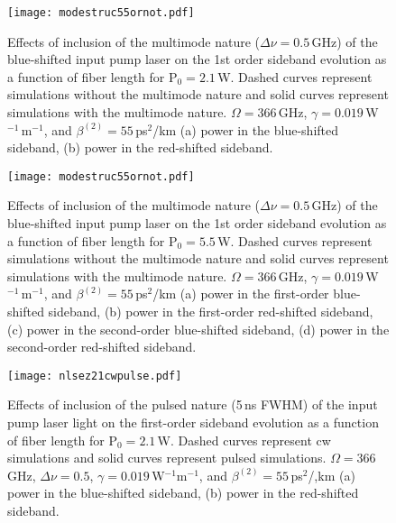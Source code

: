 \begin{figure}
\begin{center}
\texttt{[image: modestruc55ornot.pdf]}
\end{center}
\renewcommand{\baselinestretch}{1}
\small\normalsize
\begin{quote}
\caption[Short caption for Figure A.2.]
{Effects of inclusion of the multimode nature ($\Delta\nu = 0.5$\,GHz) of the blue-shifted input pump laser on the 1st order sideband evolution as a function of fiber length for P$_0 = 2.1$\,W. Dashed curves represent simulations without the multimode nature and solid curves represent simulations with the multimode nature. $\Omega = 366$\,GHz, $\gamma = 0.019$\,W$^{-1}$\,m$^{-1}$, and $\beta^{(2)} = 55$\,ps$^2$/km (a) power in the blue-shifted sideband, (b) power in the red-shifted sideband.}
\label{figA.2}
\end{quote}
\end{figure}
\renewcommand{\baselinestretch}{2}
\small\normalsize

\begin{figure}
\begin{center}
\texttt{[image: modestruc55ornot.pdf]}
\end{center}
\renewcommand{\baselinestretch}{1}
\small\normalsize
\begin{quote}
\caption[Effects of inclusion of the multimode nature]
{Effects of inclusion of the multimode nature ($\Delta\nu = 0.5$\,GHz) of the blue-shifted input pump laser on the 1st order sideband evolution as a function of fiber length for P$_0 = 5.5$\,W. Dashed curves represent simulations without the multimode nature and solid curves represent simulations with the multimode nature. $\Omega = 366$\,GHz, $\gamma = 0.019$\,W$^{-1}$\,m$^{-1}$, and $\beta^{(2)} = 55$\,ps$^2$/km (a) power in the first-order blue-shifted sideband, (b) power in the first-order red-shifted sideband, (c) power in the second-order blue-shifted sideband, (d) power in the second-order red-shifted sideband.}
\label{figA.3}
\end{quote}
\end{figure}
\renewcommand{\baselinestretch}{2}
\small\normalsize

\begin{figure}
\begin{center}
\texttt{[image: nlsez21cwpulse.pdf]}
\end{center}
\renewcommand{\baselinestretch}{1}
\small\normalsize
\begin{quote}
\caption[Effects of inclusion of the pulsed nature]
{Effects of inclusion of the pulsed nature (5\,ns FWHM) of the input pump laser light on the first-order sideband evolution as a function of fiber length for P$_0 = 2.1$\,W. Dashed curves represent cw simulations and solid curves represent pulsed simulations. $\Omega = 366$\,GHz, $\Delta\nu = 0.5$, $\gamma = 0.019$\,W$^{-1}$m$^{-1}$, and $\beta^{(2)} = 55$\,ps$^2$/,km (a) power in the blue-shifted sideband, (b) power in the red-shifted sideband.}
\label{figA.4}
\end{quote}
\end{figure}
\renewcommand{\baselinestretch}{1}
\small\normalsize

